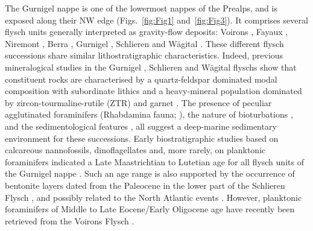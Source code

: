 \documentclass[twoside]{article}
\begin{document}
The Gurnigel nappe is one of the lowermost nappes of the Prealps, and is exposed along their NW edge (Figs.~\ref{fig:Fig1} and~\ref{fig:Fig3}). It comprises several flysch units generally interpreted as gravity-flow deposits: Voirons \citep{Lombard1940a,Ospina-Ostios2013,Ragusa2015}, Fayaux \citep{Stuijvenberg1976,Weidmann1976a,JanduChene1977,Weidmann1985}, Niremont \citep{Morel1980,Ambrosetti2005}, Berra \citep{Tercier1928a}, Gurnigel \citep{Stuijvenberg1979}, Schlieren \citep{Winkler1983,Winkler1984,Winkler1993} and Wägital \citep{Winkler1985b}. These different flysch successions share similar lithostratigraphic characteristics. Indeed, previous mineralogical studies in the Gurnigel \citep{Stuijvenberg1979}, Schlieren \citep{Winkler1983,Winkler1984} and Wägital \citep{Winkler1985b} flyschs show that constituent rocks are characterised by a quartz-feldspar dominated modal composition with subordinate lithics and a heavy-mineral population dominated by zircon-tourmaline-rutile (ZTR) and garnet \citep{Wildi1985}. The presence of peculiar agglutinated foraminifers (Rhabdamina fauna; \citealp{Brouwner1965,Weidmann1967a,Stuijvenberg1976,Ujetz1996}), the nature of bioturbations \citep{Crimes1981}, and the sedimentological features \citep{Kuenen1953}, all suggest a deep-marine sedimentary environment for these successions. Early biostratigraphic studies based on calcareous nannofossils, dinoflagellates and, more rarely, on planktonic foraminifers indicated a Late Maastrichtian to Lutetian age for all flysch units of the Gurnigel nappe \citep{Rigassi1958,Kuhn1972,JanduChene1975c,JanduChene1977,Stuijvenberg1979,Winkler1983,Winkler1984,Winkler1990,Kaenel1989}. Such an age range is also supported by the occurrence of bentonite layers dated from the Paleocene in the lower part of the Schlieren Flysch \citep{Winkler1985a,Koch2015}, and possibly related to the North Atlantic events \citep{Egger2005}. However, planktonic foraminifers of Middle to Late Eocene/Early Oligocene age have recently been retrieved from the Voirons Flysch \citep{Ujetz1996,Ospina-Ostios2013}.\par
\medskip
\end{document}
